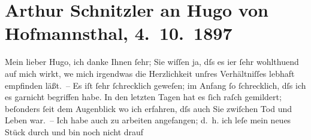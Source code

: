

         
         \renewcommand{\erwaehntePersonen}{Personen: Hugo von Hofmannsthal}
         \renewcommand{\erwaehnteOrte}{Orte: Wien}
         \renewcommand{\erwaehnteWerke}{Werke: Das Vermächtnis. Schauspiel in drei Akten, Die Frau im Fenster, Die Hochzeit der Sobeide, Die Rede Gabriele d’Annunzios. Notizen von einer Reise im oberen Italien}
               \section[Arthur Schnitzler an Hugo von Hofmannsthal, 4. 10. 1897]{ Arthur Schnitzler an Hugo von Hofmannsthal, 4. 10. 1897}\nopagebreak{}\rehead{ }\begin{ledgroupsized}[t]{13cm}\normalsize\beginnumbering{} \toendnotes[C]{\smallbreak\pagebreak[2]} 
\toendnotes[C]{\smallbreak}\pstart
           \noindent{}{\pb}Mein lieber Hugo, ich danke Ihnen ſehr; Sie wiſſen ja, dſs es i{\geminationm}er ſehr wohlthuend auf mich wirkt, we{\geminationn} mich irgendwas die Herzlichkeit unſres Verhältniſſes
               lebhaft empfinden läßt. – Es iſt ſehr ſchrecklich geweſen; im Anfang ſo ſchrecklich,
                  {\pb}dſs ich es garnicht begriffen habe. In den letzten
               Tagen hat es ſich raſch gemildert; beſonders ſeit dem Augenblick wo ich erfahren, dſs
               auch Sie zwiſchen Tod und Leben war. –\pend
           \pstart
           Ich habe auch zu arbeiten angefangen; d. h. ich leſe mein neues Stück durch und bin noch nicht drauf

\end{ledgroupsized}
